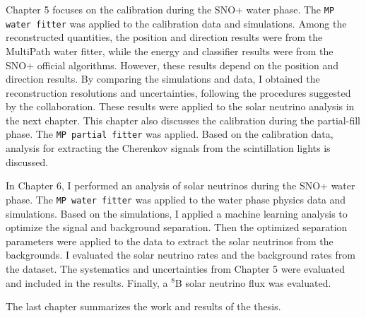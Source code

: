 Chapter 5 focuses on the calibration during the SNO+ water phase. The \texttt{MP water fitter} was applied to the calibration data and simulations. Among the reconstructed quantities, the position and direction results were from the MultiPath water fitter, while the energy and classifier results were from the SNO+ official algorithms. However, these results depend on the position and direction results. By comparing the simulations and data, I obtained the reconstruction resolutions and uncertainties, following the procedures suggested by the collaboration. These results were applied to the solar neutrino analysis in the next chapter. This chapter also discusses the calibration during the partial-fill phase. The \texttt{MP partial fitter} was applied. Based on the calibration data, analysis for extracting the Cherenkov signals from the scintillation lights is discussed.

In Chapter 6, I performed an analysis of solar neutrinos during the SNO+ water phase. The \texttt{MP water fitter} was applied to the water phase physics data and simulations. Based on the simulations, I applied a machine learning analysis to optimize the signal and background separation. Then the optimized separation parameters were applied to the data to extract the solar neutrinos from the backgrounds. I evaluated the solar neutrino rates and the background rates from the dataset. The systematics and uncertainties from Chapter 5 were evaluated and included in the results. Finally, a $^8$B solar neutrino flux was evaluated.

The last chapter summarizes the work and results of the thesis.